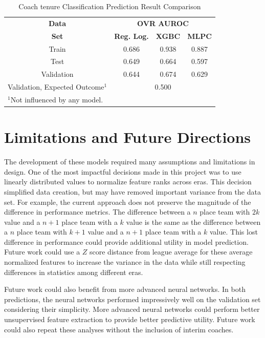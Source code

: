 \documentclass[conference]{IEEEtran}
\begin{document}
\begin{table}[htbp]
\caption{Coach tenure Classification Prediction Result Comparison}
\begin{center}
\begin{tabular}{|c||c|c|c|}
\hline
\textbf{Data} & \multicolumn{3}{|c|}{\textbf{OVR AUROC}}\\
\cline{2-4} 
\textbf{Set} & \textbf{Reg. Log.} &  \textbf{XGBC} &  \textbf{MLPC} \\
\hline
\hline
Train & 0.686 & 0.938 & 0.887\\
\hline
Test & 0.649 & 0.664 & 0.597 \\
\hline
Validation & 0.644 & 0.674 & 0.629 \\
\hline
Validation, Expected Outcome$^{\mathrm{1}}$ & \multicolumn{3}{|c|}{0.500} \\
\hline
\multicolumn{2}{l}{$^{\mathrm{1}}$Not influenced by any model.}
\end{tabular}
\label{cum2}
\end{center}
\end{table}

\section{Limitations and Future Directions}
The development of these models required many assumptions and limitations in design. One of the most impactful decisions made in this project was to use linearly distributed values to normalize feature ranks across eras. This decision simplified data creation, but may have removed important variance from the data set. For example, the current approach does not preserve the magnitude of the difference in performance metrics. The difference between a $n$ place team with $2k$ value and a $n+1$ place team with a $k$ value is the same as the difference between a $n$ place team with $k+1$ value and a $n+1$ place team with a $k$ value. This lost difference in performance could provide additional utility in model prediction. Future work could use a $Z$ score distance from league average for these average normalized features to increase the variance in the data while still respecting differences in statistics among different eras.

Future work could also benefit from more advanced neural networks. In both predictions, the neural networks performed impressively well on the validation set considering their simplicity. More advanced neural networks could perform better unsupervised feature extraction to provide better predictive utility. Future work could also repeat these analyses without the inclusion of interim coaches. 
\end{document}
